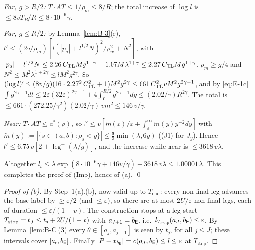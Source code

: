 \emph{Far, $g>R/2$:} $T\cdot AT\le1/\rho_m\le8/R$; the total increase of $\log l$ is $\le8vT_B/R\le8\cdot10^{-6}\gamma$.

\emph{Far, $g\le R/2$:} by Lemma~\ref{lem:B-3}(c), $l'\le(2v/\rho_m)[l(|p_a|+l^{1/2}N)^2/\rho_m^2+N^2]$, with
$|p_a|+l^{1/2}N\le2.26\,C_{\mathrm{TL}} Mg^{1+\gamma}+1.07M\lambda^{1+\gamma}\le2.27\,C_{\mathrm{TL}} Mg^{1+\gamma}$, $\rho_m\ge g/4$ and
$N^2\le M^2\lambda^{1+2\gamma}\le lM^2g^{2\gamma}$. So
$(\log l)'\le(8v/g)(16\cdot2.27^2\,C_{\mathrm{TL}}^2+1)M^2g^{2\gamma}\le661\,C_{\mathrm{TL}}^2vM^2g^{2\gamma-1}$, and by \eqref{eq:E-1c}
$\int g^{2\gamma-1}dt\le2\varepsilon(32\varepsilon)^{2\gamma-1}+4\int_0^{R/2}g^{2\gamma-1}dg\le(2.02/\gamma)R^{2\gamma}$. The total is
$\le661\cdot(272.25/\gamma^2)(2.02/\gamma)\,vm^2\le146\,v/\gamma$.

\emph{Near:} $T\cdot AT\le a^*(\rho)$, so $l'\le v[\tilde m(\varepsilon)/\varepsilon+\int_\varepsilon^\infty\tilde m(y)y^{-2}dy]$
with $\tilde m(y):=|\{s\in(a,b):\rho_s<y\}|\le\frac98\min(\lambda,6y)$ ((J1) for $J_y$). Hence
$l'\le6.75\,v[2+\log^+(\lambda/\tilde g)]$, and the increase while near is $\le3618\,v\lambda$.

Altogether $l_t\le\lambda\exp(8\cdot10^{-6}\gamma+146v/\gamma)+3618\,v\lambda\le1.00001\,\lambda$. This completes the proof of (Imp),
hence of (a). \qed

\begin{proof}[Proof of \textup{(b)}]
By Step~1(a),(b), now valid up to $T_{\mathrm{end}}$: every non-final leg advances the base label by $\ge\varepsilon/2$ (and
$\le\varepsilon$), so there are at most $2U/\varepsilon$ non-final legs, each of duration $\le\varepsilon/(1-v)$. The construction
stops at a leg start $T_{\mathrm{stop}}=t_J\le t_{\mathrm s}+2U/(1-v)$ with $a_{J+1}=b_{\mathsf E}$, i.e.\ $l_{T_{\mathrm{stop}}}(a_J,b_{\mathsf E})\le\varepsilon$.
By Lemma~\ref{lem:B-C}(3) every $\theta\in[a_j,a_{j+1}]$ is seen by $t_j$, for all $j\le J$; these intervals cover
$[a_{\mathrm s},b_{\mathsf E}]$. Finally $|P-x_{b_{\mathsf E}}|=c(a_J,b_{\mathsf E})\le l\le\varepsilon$ at $T_{\mathrm{stop}}$.
\end{proof}


